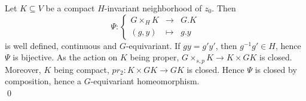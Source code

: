\begin{dem}
Let $K\subseteq V$ be a compact $H$-invariant neighborhood of $z_0$. Then   
\[\Psi : \left\{ \begin{array}{rcl}
G\times_H K & \rightarrow & G.K \\ 
(g,y) & \mapsto & g.y \end{array}\right.\]
is well defined, continuous and $G$-equivariant. If $gy =g'y' $, then $g^{-1}g'\in H$, hence $\Psi$ is bijective. As the action on $K$ being proper, $G\times_{s,p} K \rightarrow K\times GK$ is closed. Moreover, $K$ being compact, $pr_2 : K\times GK \rightarrow GK$ is closed. Hence $\Psi$ is closed by composition, hence a $G$-equivariant homeomorphism. \\
\qed
\end{dem}

